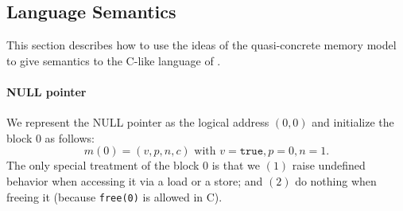 















\subsection{Language Semantics}

This section describes how to use the ideas of the quasi-concrete memory model to give semantics to the C-like language of .

\paragraph{NULL pointer} 
We represent the NULL pointer as the logical address $(0,0)$ and 
initialize the block $0$ as follows:
\[
m(0) = (v,p,n,c) \text{ with } v=\texttt{true}, p=0, n=1.
\]
The only special treatment of the block $0$ is that we $(1)$ raise
undefined behavior when accessing it via a load or a store;
and $(2)$ do nothing when freeing it (because \texttt{free(0)} is allowed in C).

